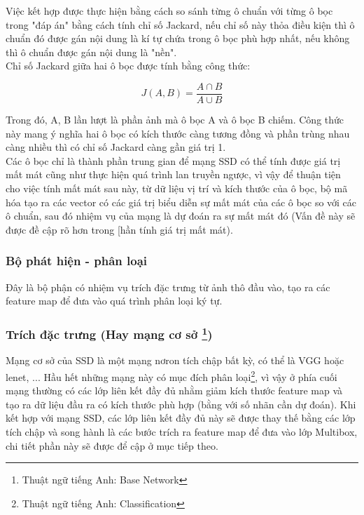 \documentclass[a4paper,12pt]{article}
\begin{document}
	Việc kết hợp được thực hiện bằng cách so sánh từng ô chuẩn với từng ô bọc trong "đáp án" bằng cách tính chỉ số Jackard, nếu chỉ số này thỏa điều kiện thì ô chuẩn đó được gán nội dung là kí tự chứa trong ô bọc phù hợp nhất, nếu không thì ô chuẩn được gán nội dung là "nền".\\
	
	Chỉ số Jackard giữa hai ô bọc được tính bằng công thức:
	
	$$  J(A, B) = \frac{A \cap B }{ A \cup B } $$
	
	Trong đó, A, B lần lượt là phần ảnh mà ô bọc A và ô bọc B chiếm. Công thức này mang ý nghĩa hai ô bọc có kích thước càng tương đồng và phần trùng nhau càng nhiều thì có chỉ số Jackard càng gần giá trị 1.\\
	
	Các ô bọc chỉ là thành phần trung gian để mạng SSD có thể tính được giá trị mất mát cũng như thực hiện quá trình lan truyền ngược, vì vậy để thuận tiện cho việc tính mất mát sau này, từ dữ liệu vị trí và kích thước của ô bọc, bộ mã hóa tạo ra các vector có các giá trị biểu diễn sự mất mát của các ô bọc so với các ô chuẩn, sau đó nhiệm vụ của mạng là dự đoán ra sự mất mát đó (Vấn đề này sẽ được đề cập rõ hơn trong [hần tính giá trị mất mát).
	
	\subsubsection{Bộ phát hiện - phân loại}
	Đây là bộ phận có nhiệm vụ trích đặc trưng từ ảnh thô đầu vào, tạo ra các feature map để đưa vào quá trình phân loại ký tự.
	
	\subsubsection*{Trích đặc trưng (Hay mạng cơ sở \footnote{Thuật ngữ tiếng Anh: Base Network})}
	
	Mạng cơ sở của SSD là một mạng nơron tích chập bất kỳ, có thể là VGG\cite{Simonyan14c} hoặc lenet\cite{yanlecun}, ... Hầu hết những mạng này có mục đích phân loại\footnote{Thuật ngữ tiếng Anh: Classification}, vì vậy ở phía cuối mạng thường có các lớp liên kết đầy đủ nhằm giảm kích thước feature map và tạo ra dữ liệu đầu ra có kích thước phù hợp (bằng với số nhãn cần dự đoán). Khi kết hợp với mạng SSD, các lớp liên kết đầy đủ này sẽ được thay thế bằng các lớp tích chập và song hành là các bước trích ra feature map để đưa vào lớp Multibox, chi tiết phần này sẽ được để cập ở mục tiếp theo.
	
\end{document}
